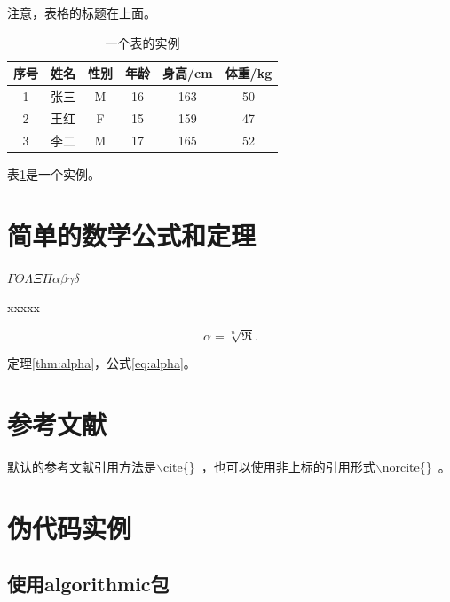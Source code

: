 \par 注意，表格的标题在上面。

\begin{table}[!ht]
\centering
\caption{一个表的实例}
\label{tab:tabobj}
    \begin{tabular}{cccccc}
        \toprule
        序号 & 姓名 & 性别 & 年龄 & 身高/cm & 体重/kg \\
        \midrule
        1 & 张三 & M & 16 & 163 & 50 \\
        2 & 王红 & F & 15 & 159 & 47 \\
        3 & 李二 & M & 17 & 165 & 52 \\
        \bottomrule
    \end{tabular}
\end{table}

\par 表\ref{tab:tabobj}是一个实例。

\section{简单的数学公式和定理}

\begin{sthm}
    $\Gamma\Theta\Lambda\Xi\Pi\alpha\beta\gamma\delta$
\end{sthm}

\begin{thm}
\label{thm:alpha}
    xxxxx
\end{thm}

\begin{equation}
\label{eq:alpha}
    \alpha=\sqrt[n]{\Re}.
\end{equation}
\par 定理\ref{thm:alpha}，公式\ref{eq:alpha}。

\section{参考文献}

默认的参考文献引用方法是$\backslash$cite\{\}~\cite{broder1997resemblance,broder1997syntactic}，也可以使用非上标的引用形式$\backslash$norcite\{\}~。


\section{伪代码实例}

\subsection{使用algorithmic包}

